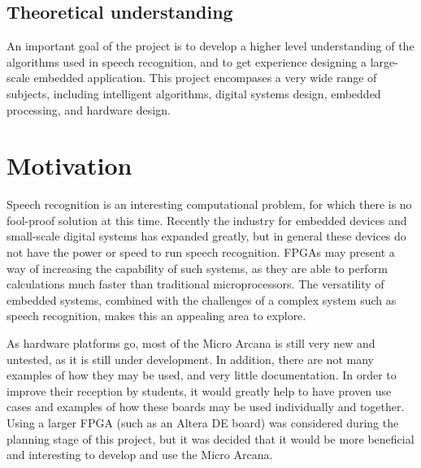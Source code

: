 	\subsection{Theoretical understanding} %
	\label{sec:theoretical_understanding}
		An important goal of the project is to develop a higher level understanding of the algorithms used in speech recognition, and to get experience designing a large-scale embedded application.  This project encompases a very wide range of subjects, including intelligent algorithms, digital systems design, embedded processing, and hardware design.



\section{Motivation} %
\label{sec:motivation}
	Speech recognition is an interesting computational problem, for which there is no fool-proof solution at this time.  Recently the industry for embedded devices and small-scale digital systems has expanded greatly, but in general these devices do not have the power or speed to run speech recognition.  FPGAs may present a way of increasing the capability of such systems, as they are able to perform calculations much faster than traditional microprocessors.  The versatility of embedded systems, combined with the challenges of a complex system such as speech recognition, makes this an appealing area to explore.

	As hardware platforms go, most of the Micro Arcana is still very new and untested, as it is still under development.  In addition, there are not many examples of how they may be used, and very little documentation.  In order to improve their reception by students, it would greatly help to have proven use cases and examples of how these boards may be used individually and together.  Using a larger FPGA (such as an Altera DE board) was considered during the planning stage of this project, but it was decided that it would be more beneficial and interesting to develop and use the Micro Arcana.


